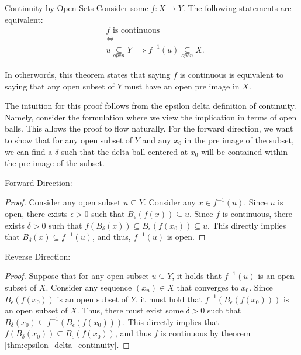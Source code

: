 \begin{thm}{Continuity by Open Sets}{}
Consider some \(f:X\to Y\). The following statements are equivalent:
\begin{align*}
  &f \textrm{ is continuous}\\
  &\iff \\
  &u \underset{open}{\subseteq}Y \implies f^{-1}(u) \underset{open}{\subseteq} X.
\end{align*}

In otherwords, this theorem states that saying \(f\) is continuous is equivalent to saying that any open subset of \(Y\) must have an open pre image in \(X\).\newline 

The intuition for this proof follows from the epsilon delta definition of continuity. Namely, consider the formulation where we view the implication in terms of open balls. This allows the proof to flow naturally. For the forward direction, we want to show that for any open subset of \(Y\) and any \(x_0\) in the pre image of the subset, we can find a \(\delta\) such that the delta ball centered at \(x_0\) will be contained within the pre image of the subset. \newline 

Forward Direction:
\begin{proof}
Consider any open subset \(u \subseteq Y\). Consider any \(x \in f^{-1}(u)\). Since \(u\) is open, there exists \(\epsilon > 0\) such that \(B_\epsilon(f(x)) \subseteq u\). Since \(f\) is continuous, there exists \(\delta > 0\) such that \(f(B_\delta(x)) \subseteq B_\epsilon(f(x_0)) \subseteq u\). This directly implies that \(B_\delta(x) \subseteq f^{-1}(u)\), and thus, \(f^{-1}(u)\) is open.
\end{proof}
Reverse Direction:
\begin{proof}
Suppose that for any open subset \(u \subseteq Y\), it holds that \(f^{-1}(u)\) is an open subset of \(X\). Consider any sequence \((x_n) \in X\) that converges to \(x_0\). Since \(B_\epsilon(f(x_0))\) is an open subset of \(Y\), it must hold that \(f^{-1}(B_\epsilon(f(x_0)))\) is an open subset of \(X\). Thus, there must exist some \(\delta > 0\) such that \(B_\delta(x_0) \subseteq f^{-1}(B_\epsilon(f(x_0)))\). This directly implies that \(f(B_\delta(x_0)) \subseteq B_\epsilon(f(x_0))\), and thus \(f\) is continuous by theorem \ref{thm:epsilon_delta_continuity}.
\end{proof}
\end{thm}

